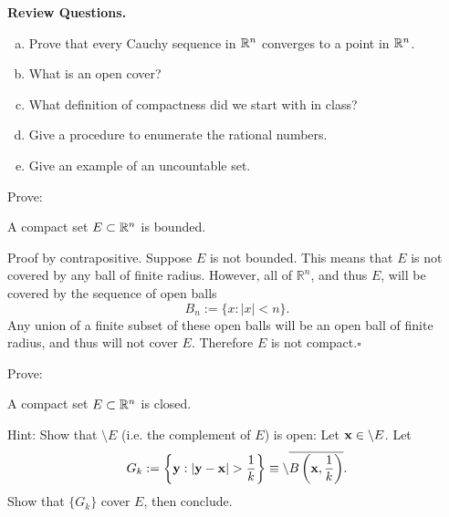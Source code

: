 
\noindent
\textbf{Review Questions.}
\begin{enumerate}[(a)]
  \item Prove that every Cauchy sequence in $\mathbb{R}^n$ converges to a point in $\mathbb{R}^n$.
  \item What is an open cover?
  \item What definition of compactness did we start with in class?
  \item Give a procedure to enumerate the rational numbers.
  \item Give an example of an uncountable set.
\end{enumerate}

\bigskip

\noindent
Prove:
\begin{prop}\label{prop:compact_is_bounded}
A compact set $E \subset \mathbb{R}^n$ is bounded.
\end{prop}

Proof by contrapositive. Suppose $E$ is not bounded. This means that $E$ is not covered by any ball of
finite radius. However, all of $\mathbb{R}^n$, and thus $E$, will be covered by the sequence of open balls
$$B_n := \{ x:\left|x\right|< n\}.$$ Any union of a finite subset of these open balls will be an open ball of finite
radius, and thus will not cover $E$. Therefore $E$ is not compact.$\square$\\

\medskip

\noindent
Prove:

\begin{prop}\label{prop:compact_is_closed}
A compact set $E \subset \mathbb{R}^n$ is closed.
\end{prop}
\noindent
Hint: Show that $\setminus E$ (i.e. the complement of $E$) is open: Let $\mathbf{x} \in \setminus E$. Let
\begin{equation*}
  G_k := \left\{ \mathbf{y} : |\mathbf{y} - \mathbf{x}| > \frac{1}{k} \right\} \equiv \setminus \overline{B \left(\mathbf{x},\frac{1}{k}\right)}.
\end{equation*}
Show that $\{ G_k \}$ cover $E$, then conclude.\\


